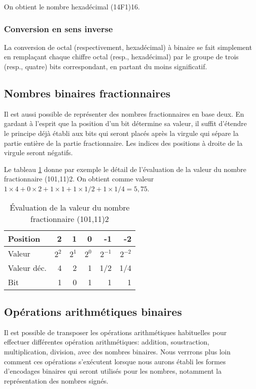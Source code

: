 \documentclass[11pt]{article}
\begin{document}
On obtient le nombre hexadécimal (14F1)16.

\subsubsection{Conversion en sens inverse}
\label{sec:org294a0f5}

La conversion de octal (respectivement, hexadécimal) à binaire se fait
simplement en remplaçant chaque chiffre octal (resp., hexadécimal) par
le groupe de trois (resp., quatre) bits correspondant, en partant du
moins significatif.

\subsection{Nombres binaires fractionnaires}
\label{sec:orgb841577}

Il est aussi possible de représenter des nombres fractionnaires en
base deux. En gardant à l'esprit que la position d'un bit détermine sa
valeur, il suffit d'étendre le principe déjà établi aux bits qui
seront placés après la virgule qui sépare la partie entière de la
partie fractionnaire. Les indices des positions à droite de la virgule
seront négatifs.

Le tableau \ref{tab:orgdfb222f} donne par exemple le détail de l'évaluation
de la valeur du nombre fractionnaire (101,11)2. On obtient comme
valeur \(1 \times 4 + 0 \times 2 + 1 \times 1 + 1 \times 1/2 + 1
\times 1/4 = 5,75\).

\begin{table}[htbp]
\caption{\label{tab:orgdfb222f}Évaluation de la valeur du nombre fractionnaire (101,11)2}
\centering
\begin{tabular}{lrrrrr}
Position & 2 & 1 & 0 & -1 & -2\\
\hline
Valeur & \(2^2\) & \(2^1\) & \(2^0\) & \(2^{-1}\) & \(2^{-2}\)\\
Valeur déc. & 4 & 2 & 1 & 1/2 & 1/4\\
Bit & 1 & 0 & 1 & 1 & 1\\
\end{tabular}
\end{table}

\subsection{Opérations arithmétiques binaires}
\label{sec:org544f1d9}

Il est possible de transposer les opérations arithmétiques habituelles
pour effectuer différentes opération arithmétiques: addition,
soustraction, multiplication, division, avec des nombres
binaires. Nous verrrons plus loin comment ces opérations s'exécutent
lorsque nous aurons établi les formes d'encodages binaires qui seront
utilisés pour les nombres, notamment la représentation des nombres
signés.
\end{document}
